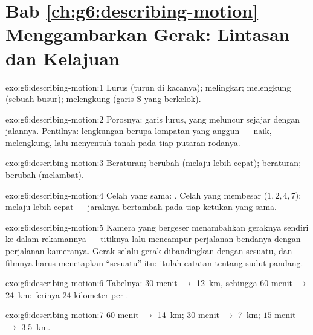 \section*{Bab \ref{ch:g6:describing-motion} --- Menggambarkan Gerak: Lintasan dan Kelajuan}

\begin{solution}{exo:g6:describing-motion:1}
Lurus (turun di kacanya); melingkar; melengkung (sebuah busur);
melengkung (garis S yang berkelok).
\end{solution}

\begin{solution}{exo:g6:describing-motion:2}
Porosnya: garis lurus, yang meluncur sejajar dengan jalannya.
Pentilnya: lengkungan berupa lompatan yang anggun --- naik, melengkung,
lalu menyentuh tanah pada tiap putaran rodanya.
\end{solution}

\begin{solution}{exo:g6:describing-motion:3}
Beraturan; berubah (melaju lebih cepat); beraturan; berubah (melambat).
\end{solution}

\begin{solution}{exo:g6:describing-motion:4}
Celah yang sama: . Celah yang membesar ($1, 2, 4, 7$):
melaju lebih cepat --- jaraknya bertambah pada tiap ketukan yang sama.
\end{solution}

\begin{solution}{exo:g6:describing-motion:5}
Kamera yang bergeser menambahkan geraknya sendiri ke dalam rekamannya
--- titiknya lalu mencampur perjalanan bendanya dengan perjalanan
kameranya. Gerak selalu gerak dibandingkan dengan sesuatu, dan filmnya
harus menetapkan ``sesuatu'' itu: itulah catatan tentang sudut pandang.
\end{solution}

\begin{solution}{exo:g6:describing-motion:6}
Tabelnya: $30$ menit $\to$ \qty{12}{km}, sehingga $60$ menit $\to$
\qty{24}{km}:  ferinya $24$ kilometer per .
\end{solution}

\begin{solution}{exo:g6:describing-motion:7}
$60$ menit $\to$ \qty{14}{km}; $30$ menit $\to$ \qty{7}{km}; $15$
menit $\to$ \qty{3.5}{km}.
\end{solution}

